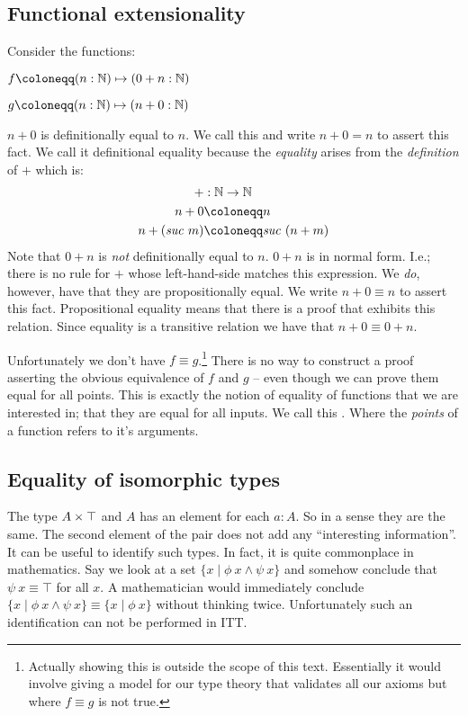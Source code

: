 \documentclass{article}
\begin{document}
\subsection{Functional extensionality}
Consider the functions:
%
\begin{multicols}{2}
$f \defeq (n : \bN) \mapsto (0 + n : \bN)$

$g \defeq (n : \bN) \mapsto (n + 0 : \bN)$
\end{multicols}
%
$n + 0$ is definitionally equal to $n$. We call this 
and write $n + 0 = n$ to assert this fact. We call it definitional
equality because the \emph{equality} arises from the \emph{definition} of $+$
which is:
%
\newcommand{\suc}[1]{\mathit{suc}\ #1}
\begin{align*}
  +           & : \bN \to \bN              \\
  n + 0       & \defeq n                   \\
  n + (\suc{m}) & \defeq \suc{(n + m)}
\end{align*}
%
Note that $0 + n$ is \emph{not} definitionally equal to $n$. $0 + n$ is in
normal form. I.e.; there is no rule for $+$ whose left-hand-side matches this
expression. We \emph{do}, however, have that they are propositionally equal. We
write $n + 0 \equiv n$ to assert this fact. Propositional equality means that
there is a proof that exhibits this relation. Since equality is a transitive
relation we have that $n + 0 \equiv 0 + n$.

Unfortunately we don't have $f \equiv g$.\footnote{Actually showing this is
outside the scope of this text. Essentially it would involve giving a model
for our type theory that validates all our axioms but where $f \equiv g$ is
not true.} There is no way to construct a proof asserting the obvious
equivalence of $f$ and $g$ -- even though we can prove them equal for all
points. This is exactly the notion of equality of functions that we are
interested in; that they are equal for all inputs. We call this
. Where the \emph{points} of a function refers
to it's arguments.
%
\iffalse
I also want to talk about:
\begin{itemize}
\item
  Foundational systems
\item
  Theory vs. metatheory
\item
  Internal type theory
\end{itemize}
\fi
\subsection{Equality of isomorphic types}
%
The type $A \times \top$ and $A$ has an element for each $a : A$. So in a sense they
are the same. The second element of the pair does not add any ``interesting
information''. It can be useful to identify such types. In fact, it is quite
commonplace in mathematics. Say we look at a set $\{x \mid \phi\ x \land
\psi\ x\}$ and somehow conclude that $\psi\ x \equiv \top$ for all $x$. A
mathematician would immediately conclude $\{x \mid \phi\ x \land \psi\ x\}
\equiv \{x \mid \phi\ x\}$ without thinking twice. Unfortunately such an
identification can not be performed in ITT. 
\end{document}
